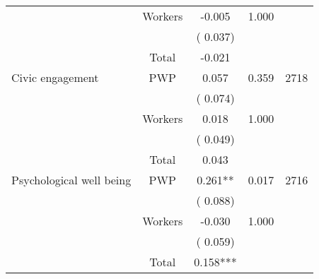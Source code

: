 \begin{tabular}{l*{4}{c}}
                               &       Workers         &             -0.005               &        1.000   &                                               \\ 
                               &                               &       (       0.037)                     & &                                                                             \\ 
\cmidrule{2-3}
                               &       Total           &             -0.021               &   &                                               \\ 
\cmidrule{2-3}
 Civic engagement                &       PWP     &              0.057               &        0.359   & 2718                              \\ 
                               &                               &       (       0.074)                     & &                                                                             \\ 
                               &       Workers         &              0.018               &        1.000   &                                               \\ 
                               &                               &       (       0.049)                     & &                                                                             \\ 
\cmidrule{2-3}
                               &       Total           &              0.043               &   &                                               \\ 
\cmidrule{2-3}
 Psychological well being                &       PWP     &              0.261**               &        0.017   & 2716                              \\ 
                               &                               &       (       0.088)                     & &                                                                             \\ 
                               &       Workers         &             -0.030               &        1.000   &                                               \\ 
                               &                               &       (       0.059)                     & &                                                                             \\ 
\cmidrule{2-3}
                               &       Total           &              0.158***               &   &                                               \\ 

\end{tabular}
